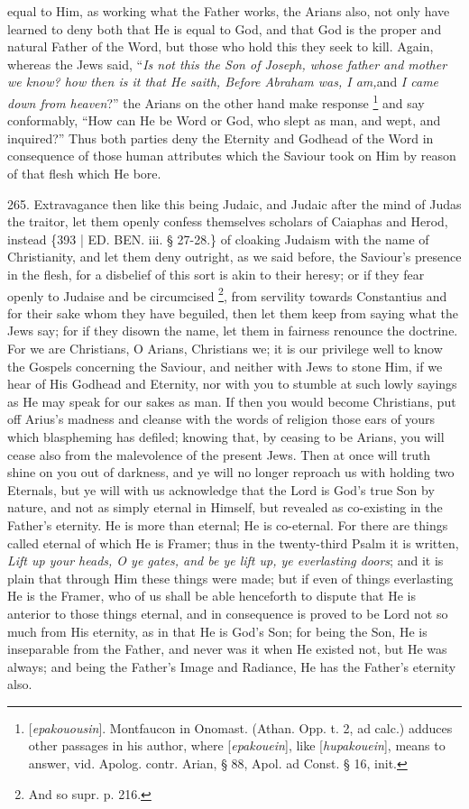 equal to Him, as working what the Father works, the Arians also, not
only have learned to deny both that He is equal to God, and that God
is the proper and natural Father of the Word, but those who hold this
they seek to kill. Again, whereas the Jews said, ``\emph{Is not this the
Son of Joseph, whose father and mother we know? how then is it that He
saith, Before Abraham was, I am,}and \emph{I came down from heaven}?''
the Arians on the other hand make response \footnote{[\emph{epakouousin}]. Montfaucon in Onomast. (Athan. Opp. t. 2, ad
calc.) adduces other passages in his author, where [\emph{epakouein}],
like [\emph{hupakouein}], means to answer, vid. Apolog. contr. Arian,
§ 88, Apol. ad Const. § 16, init.} and say conformably, ``How can He be Word or God, who slept as
man, and wept, and inquired?'' Thus both parties deny the Eternity and
Godhead of the Word in consequence of those human attributes which the
Saviour took on Him by reason of that flesh which He bore.

265.
Extravagance then like this being Judaic, and Judaic after the mind of
Judas the traitor, let them openly confess themselves scholars of
Caiaphas and Herod, instead \{393 | ED. BEN. iii. § 27-28.\}
of cloaking Judaism with the name of Christianity, and let them deny
outright, as we said before, the Saviour's presence in the flesh, for
a disbelief of this sort is akin to their heresy; or if they fear
openly to Judaise and be circumcised \footnote{And so supr. p. 216.}, from servility towards Constantius and for their sake whom
they have beguiled, then let them keep from saying what the Jews say;
for if they disown the name, let them in fairness renounce the
doctrine. For we are Christians, O Arians, Christians we; it is our
privilege well to know the Gospels concerning the Saviour, and neither
with Jews to stone Him, if we hear of His Godhead and Eternity, nor
with you to stumble at such lowly sayings as He may speak for our
sakes as man. If then you would become Christians, put off Arius's
madness and cleanse with the words of religion those ears of yours
which blaspheming has defiled; knowing that, by ceasing to be Arians,
you will cease also from the malevolence of the present Jews. Then at
once will truth shine on you out of darkness, and ye will no longer
reproach us with holding two Eternals, but ye will with us acknowledge
that the Lord is God's true Son by nature, and not as simply eternal
in Himself, but revealed as co-existing in the Father's eternity. He
is more than eternal; He is co-eternal. For there are things called
eternal of which He is Framer; thus in the twenty-third Psalm it is
written, \emph{Lift up your heads, O ye gates, and be ye lift up, ye
everlasting doors}; and it is plain that through Him these things
were made; but if even of things everlasting He is the Framer, who of
us shall be able henceforth to dispute that He is anterior to those
things eternal, and in consequence is proved to be Lord not so much
from His eternity, as in that He is God's Son; for being the Son, He
is inseparable from the Father, and never was it when He existed not,
but He was always; and being the Father's Image and Radiance, He
has the Father's eternity also.

